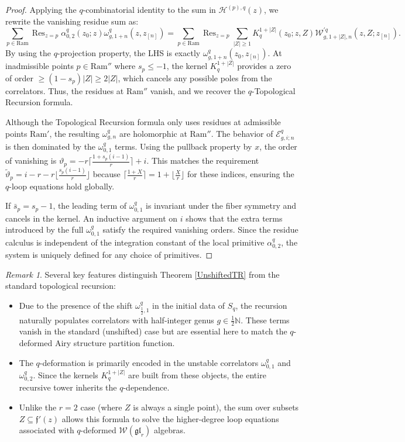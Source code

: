 \documentclass[reqno,11pt]{amsart}
\theoremstyle{plain}
\theoremstyle{definition}
\theoremstyle{remark}
\newtheorem{remark}[theorem]{Remark}
\numberwithin{equation}{section}
\renewcommand{\theta}{\vartheta}
\newcommand{\mb}[1]{\mathbb{#1}}
\newcommand{\mf}[1]{\mathfrak{#1}}
\newcommand{\1}{\mathds{1}}
\newcommand{\N}{\mb{N}}
\newcommand{\2}{\frac{1}{2}}
\DeclareMathOperator*{\Res}{Res}
\begin{document}
{\begin{proof}
					{Applying the $q$-combinatorial identity to the sum in $\mathcal{H}^{(p),q}(z)$, we rewrite the vanishing residue sum as:
						\begin{equation}
							\sum_{p \in \text{Ram}} \Res_{z=p} \alpha^{q}_{0,2}(z_0; z) \omega^q_{g,1+n}(z, z_{[n]}) = \sum_{p \in \text{Ram}} \Res_{z=p} \sum_{|Z| \geq 1} K_q^{1+|Z|}(z_0; z, Z) \mathcal{W}^{'q}_{g,1+|Z|,n}(z, Z; z_{[n]}).
						\end{equation}
						By using the $q$-projection property, the LHS is exactly $\omega^q_{g,1+n}(z_0, z_{[n]})$. At inadmissible points $p \in \text{Ram}''$ where $s_p \leq -1$, the kernel $K_q^{1+|Z|}$ provides a zero of order $\geq (1-s_p)|Z| \geq 2|Z|$, which cancels any possible poles from the correlators. Thus, the residues at $\text{Ram}''$ vanish, and we recover the $q$-Topological Recursion formula.}
					
					{Although the Topological Recursion formula only uses residues at admissible points $\text{Ram}'$, the resulting $\omega^q_{g,n}$ are holomorphic at $\text{Ram}''$. The behavior of $\mathcal{E}^q_{g,i;n}$ is then dominated by the $\omega^q_{0,1}$ terms. Using the pullback property by $x$, the order of vanishing is $\theta_p = -r \lceil \frac{1+s_p(i-1)}{r} \rceil + i$. This matches the requirement $\tilde{\theta}_p = i - r - r \lfloor \frac{s_p(i-1)}{r} \rfloor$ because $\lceil \frac{1+X}{r} \rceil = 1 + \lfloor \frac{X}{r} \rfloor$ for these indices, ensuring the $q$-loop equations hold globally.}
					
					{If $\bar{s}_p = s_p - 1$, the leading term of $\omega^q_{0,1}$ is invariant under the fiber symmetry and cancels in the kernel. An inductive argument on $i$ shows that the extra terms introduced by the full $\omega^q_{0,1}$ satisfy the required vanishing orders. Since the residue calculus is independent of the integration constant of the local primitive $\alpha^q_{0,2}$, the system is uniquely defined for any choice of primitives.}
				\end{proof}
				\begin{remark}
					Several key features distinguish Theorem \ref{UnshiftedTR} from the standard topological recursion:
					\begin{itemize}
						\item[(a)]Due to the presence of the shift $\omega^{q}_{\frac{1}{2},1}$ in the initial data of $S_q$, the recursion naturally populates correlators with half-integer genus $g \in \frac{1}{2} \N$. These terms vanish in the standard (unshifted) case but are essential here to match the $q$-deformed Airy structure partition function.
						\item[(b)]The $q$-deformation is primarily encoded in the unstable correlators $\omega^{q}_{0,1}$ and  $\omega^{q}_{0,2}$. Since the kernels $K^{1+|Z|}_q$ are built from these objects, the entire recursive tower inherits the $q$-dependence.
						\item[(c)] Unlike the $r=2$ case (where $Z$ is always a single point), the sum over subsets $Z \subseteq \mf{f}' (z)$ allows this formula to solve the higher-degree loop equations associated with $q$-deformed $\mathcal{W}(\mathfrak{gl}_r)$ algebras.
					\end{itemize}
				\end{remark}
}
\end{document}
